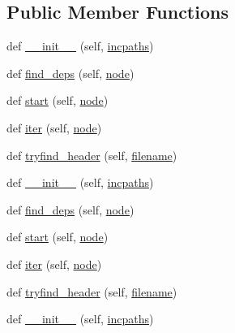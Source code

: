 \subsection*{Public Member Functions}
\begin{DoxyCompactItemize}
\item 
def \hyperlink{classwaflib_1_1_tools_1_1fc__scan_1_1fortran__parser_a53c17dbafe5f1887eec6f5221fc19083}{\+\_\+\+\_\+init\+\_\+\+\_\+} (self, \hyperlink{classwaflib_1_1_tools_1_1fc__scan_1_1fortran__parser_a9ca545fb7876aab508df3fcb8c298f59}{incpaths})
\item 
def \hyperlink{classwaflib_1_1_tools_1_1fc__scan_1_1fortran__parser_a75f33cebf7d879d9a1bac1bbdffb006f}{find\+\_\+deps} (self, \hyperlink{structnode}{node})
\item 
def \hyperlink{classwaflib_1_1_tools_1_1fc__scan_1_1fortran__parser_a101c0766de664d1ea3f18c1207975d34}{start} (self, \hyperlink{structnode}{node})
\item 
def \hyperlink{classwaflib_1_1_tools_1_1fc__scan_1_1fortran__parser_ab684de9ae5dcf3a21da6d54a9492a2f7}{iter} (self, \hyperlink{structnode}{node})
\item 
def \hyperlink{classwaflib_1_1_tools_1_1fc__scan_1_1fortran__parser_a7b77b8d6d5dcb63f46aaaf8c52279160}{tryfind\+\_\+header} (self, \hyperlink{test__portburn_8cpp_a7efa5e9c7494c7d4586359300221aa5d}{filename})
\item 
def \hyperlink{classwaflib_1_1_tools_1_1fc__scan_1_1fortran__parser_a53c17dbafe5f1887eec6f5221fc19083}{\+\_\+\+\_\+init\+\_\+\+\_\+} (self, \hyperlink{classwaflib_1_1_tools_1_1fc__scan_1_1fortran__parser_a9ca545fb7876aab508df3fcb8c298f59}{incpaths})
\item 
def \hyperlink{classwaflib_1_1_tools_1_1fc__scan_1_1fortran__parser_a75f33cebf7d879d9a1bac1bbdffb006f}{find\+\_\+deps} (self, \hyperlink{structnode}{node})
\item 
def \hyperlink{classwaflib_1_1_tools_1_1fc__scan_1_1fortran__parser_a101c0766de664d1ea3f18c1207975d34}{start} (self, \hyperlink{structnode}{node})
\item 
def \hyperlink{classwaflib_1_1_tools_1_1fc__scan_1_1fortran__parser_ab684de9ae5dcf3a21da6d54a9492a2f7}{iter} (self, \hyperlink{structnode}{node})
\item 
def \hyperlink{classwaflib_1_1_tools_1_1fc__scan_1_1fortran__parser_a7b77b8d6d5dcb63f46aaaf8c52279160}{tryfind\+\_\+header} (self, \hyperlink{test__portburn_8cpp_a7efa5e9c7494c7d4586359300221aa5d}{filename})
\item 
def \hyperlink{classwaflib_1_1_tools_1_1fc__scan_1_1fortran__parser_a53c17dbafe5f1887eec6f5221fc19083}{\+\_\+\+\_\+init\+\_\+\+\_\+} (self, \hyperlink{classwaflib_1_1_tools_1_1fc__scan_1_1fortran__parser_a9ca545fb7876aab508df3fcb8c298f59}{incpaths})

\end{DoxyCompactItemize}
